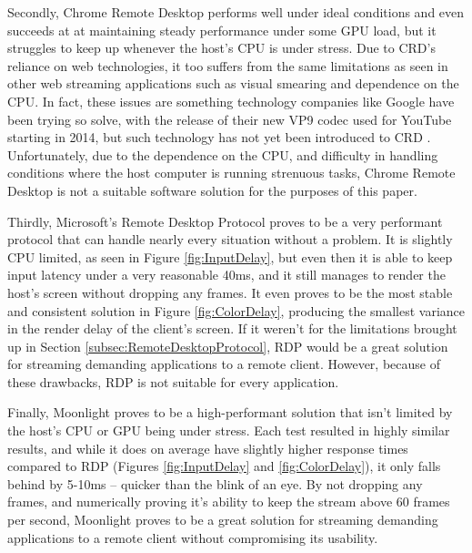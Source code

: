 Secondly, Chrome Remote Desktop performs well under ideal conditions and even succeeds at at maintaining steady performance under some GPU load, but it struggles to keep up whenever the host's CPU is under stress.
Due to CRD's reliance on web technologies, it too suffers from the same limitations as seen in other web streaming applications such as visual smearing and dependence on the CPU.
In fact, these issues are something technology companies like Google have been trying so solve, with the release of their new VP9 codec used for YouTube starting in 2014, but such technology has not yet been introduced to CRD \cite{google_io_vp9}.
Unfortunately, due to the dependence on the CPU, and difficulty in handling conditions where the host computer is running strenuous tasks, Chrome Remote Desktop is not a suitable software solution for the purposes of this paper.

Thirdly, Microsoft's Remote Desktop Protocol proves to be a very performant protocol that can handle nearly every situation without a problem.
It is slightly CPU limited, as seen in Figure \ref{fig:InputDelay}, but even then it is able to keep input latency under a very reasonable 40ms, and it still manages to render the host's screen without dropping any frames.
It even proves to be the most stable and consistent solution in Figure \ref{fig:ColorDelay}, producing the smallest variance in the render delay of the client's screen.
If it weren't for the limitations brought up in Section \ref{subsec:RemoteDesktopProtocol}, RDP would be a great solution for streaming demanding applications to a remote client.
However, because of these drawbacks, RDP is not suitable for every application.

Finally, Moonlight proves to be a high-performant solution that isn't limited by the host's CPU or GPU being under stress.
Each test resulted in highly similar results, and while it does on average have slightly higher response times compared to RDP (Figures \ref{fig:InputDelay} and \ref{fig:ColorDelay}), it only falls behind by 5-10ms -- quicker than the blink of an eye.
By not dropping any frames, and numerically proving it's ability to keep the stream above 60 frames per second, Moonlight proves to be a great solution for streaming demanding applications to a remote client without compromising its usability.